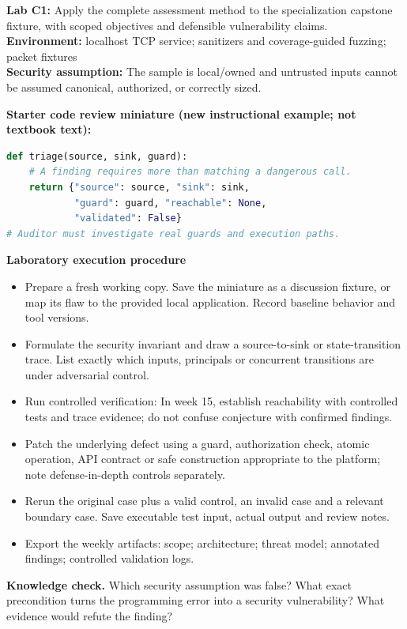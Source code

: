 \documentclass[10pt,letterpaper]{article}
\begin{document}
\begin{insight}\textbf{Lab C1:} Apply the complete assessment method to the specialization capstone fixture, with scoped objectives and defensible vulnerability claims.\\\textbf{Environment:} localhost TCP service; sanitizers and coverage-guided fuzzing; packet fixtures\\\textbf{Security assumption:} The sample is local/owned and untrusted inputs cannot be assumed canonical, authorized, or correctly sized.\end{insight}
\textbf{Starter code review miniature (new instructional example; not textbook text):}
\begin{lstlisting}[language=Python]
def triage(source, sink, guard):
    # A finding requires more than matching a dangerous call.
    return {"source": source, "sink": sink,
            "guard": guard, "reachable": None,
            "validated": False}
# Auditor must investigate real guards and execution paths.
\end{lstlisting}
\textbf{Laboratory execution procedure}
\begin{itemize}[leftmargin=*,itemsep=2pt]
\item Prepare a fresh working copy. Save the miniature as a discussion fixture, or map its flaw to the provided local application. Record baseline behavior and tool versions.
\item Formulate the security invariant and draw a source-to-sink or state-transition trace. List exactly which inputs, principals or concurrent transitions are under adversarial control.
\item Run controlled verification: In week 15, establish reachability with controlled tests and trace evidence; do not confuse conjecture with confirmed findings.
\item Patch the underlying defect using a guard, authorization check, atomic operation, API contract or safe construction appropriate to the platform; note defense-in-depth controls separately.
\item Rerun the original case plus a valid control, an invalid case and a relevant boundary case. Save executable test input, actual output and review notes.
\item Export the weekly artifacts: scope; architecture; threat model; annotated findings; controlled validation logs.
\end{itemize}
\textbf{Knowledge check.} Which security assumption was false? What exact precondition turns the programming error into a security vulnerability? What evidence would refute the finding?
\end{document}
